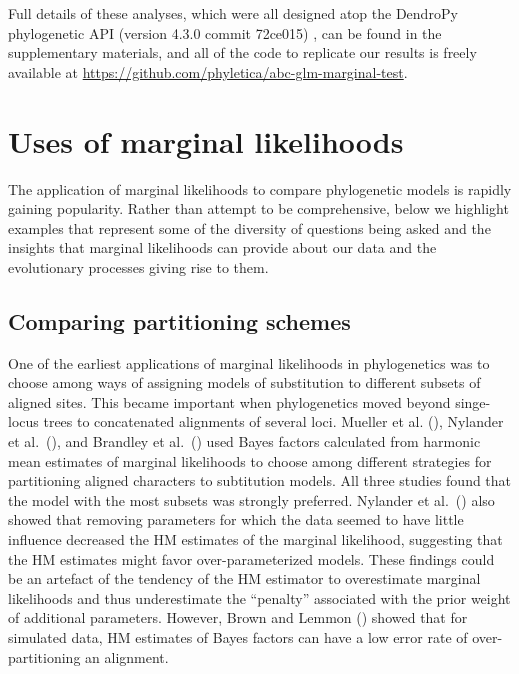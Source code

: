 Full details of these analyses, which were all designed atop the DendroPy
phylogenetic API (version 4.3.0 commit 72ce015) \citep{Sukumaran2010}, can be
found in the supplementary materials, and all of the code to replicate our
results is freely available at
\href{https://github.com/phyletica/abc-glm-marginal-test}{https://github.com/phyletica/abc-glm-marginal-test}.


\section{Uses of marginal likelihoods}

The application of marginal likelihoods to compare phylogenetic models is
rapidly gaining popularity.
Rather than attempt to be comprehensive, below we highlight examples that
represent some of the diversity of questions being asked and the insights that
marginal likelihoods can provide about our data and the evolutionary processes
giving rise to them.

\subsection{Comparing partitioning schemes}

One of the earliest applications of marginal likelihoods in phylogenetics was
to choose among ways of assigning models of substitution to different subsets
of aligned sites.
This became important when phylogenetics moved beyond singe-locus trees to
concatenated alignments of several loci.
Mueller et al. (\citeyear{Mueller2004}),
Nylander et al.\ (\citeyear{NylanderEtal2004}), and
Brandley et al.\ (\citeyear{Brandley2005})
used Bayes factors calculated from harmonic mean
estimates of marginal likelihoods to choose among different strategies for
partitioning aligned characters to subtitution models.
All three studies found that the model with the most subsets was strongly
preferred.
Nylander et al.\ (\citeyear{NylanderEtal2004}) also showed that removing
parameters for which the data seemed to have little influence decreased the HM
estimates of the marginal likelihood, suggesting that the HM estimates might
favor over-parameterized models.
These findings could be an artefact of the tendency of the HM estimator to 
overestimate marginal likelihoods and thus underestimate the ``penalty''
associated with the prior weight of additional parameters.
However, Brown and Lemmon (\citeyear{Brown2007}) showed that for simulated data,
HM estimates of Bayes factors can have a low error rate of over-partitioning an
alignment.

